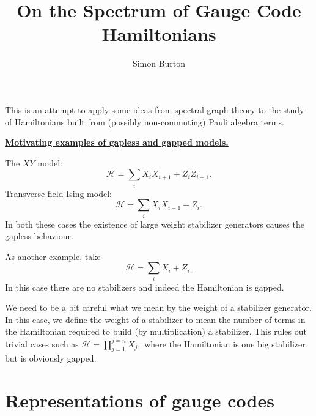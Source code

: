 \documentclass[12pt,notitlepage,longbibliography,nofootinbib,tightenlines]{revtex4}
\begin{document}
\title{On the Spectrum of Gauge Code Hamiltonians}

\author{Simon Burton}

\maketitle

\def\Complex{\mathbb{C}}
\def\Z{\mathbb{Z}}
\def\Ham{\mathcal{H}}
\def\Pauli{\mathcal{P}}
\def\Spec{\mbox{Spec}}
\def\Proveit{{\it (Proof??)}}
\def\GL{\mathrm{GL}}
\def\half{\frac{1}{2}}


This is an attempt to apply some ideas from
spectral graph theory to the study of Hamiltonians
built from (possibly non-commuting) Pauli algebra terms.

{\noindent\bf\underline{Motivating examples of gapless and gapped models.}}

The $XY$ model:
$$
    \Ham = \sum_i X_i X_{i+1} + Z_i Z_{i+1}.
$$
Transverse field Ising model:
$$
    \Ham = \sum_i X_i X_{i+1} + Z_i.
$$
In both these cases the existence of large weight stabilizer generators
causes the gapless behaviour.

As another example, take 
$$
    \Ham = \sum_i X_i + Z_i.
$$
In this case there are no stabilizers and indeed the Hamiltonian is gapped.

We need to be a bit careful what we mean by 
the weight of a stabilizer generator.
In this case, we define the weight of a stabilizer to mean the number
of terms in the Hamiltonian required to build (by multiplication)
a stabilizer. 
This rules out trivial cases such as 
$\Ham = \prod_{j=1}^{j=n} X_j,$ where the Hamiltonian is one big stabilizer
but is obviously gapped.


\section{Representations of gauge codes}
\end{document}

